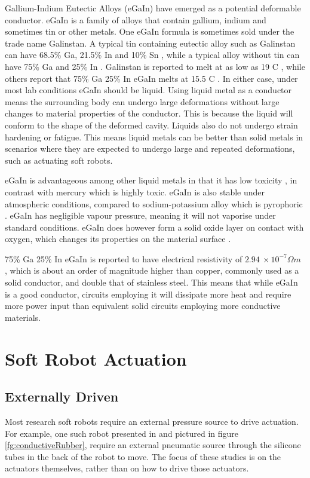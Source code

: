 \documentclass[a4paper,12pt]{article}
\begin{document}
Gallium-Indium Eutectic Alloys (eGaIn) have emerged as a potential deformable conductor. eGaIn is a family of alloys that contain gallium, indium and sometimes tin or other metals. One eGaIn formula is sometimes sold under the trade name Galinstan. A typical tin containing eutectic alloy such as Galinstan can have 68.5\% Ga, 21.5\% In and 10\% Sn \cite{liuCharacterizationNontoxicLiquidMetal2012}, while a typical alloy without tin can have 75\% Ga and 25\% In \cite{dickeyEutecticGalliumIndiumEGaIn2008}. Galinstan is reported to melt at as low as 19 \degree C \cite{surmannVoltammetricAnalysisUsing2005}, while others report that 75\% Ga 25\% In eGaIn melts at 15.5 \degree C \cite{dickeyEutecticGalliumIndiumEGaIn2008}. In either case, under most lab conditions eGaIn should be liquid.
Using liquid metal as a conductor means the surrounding body can undergo large deformations without large changes to material properties of the conductor. This is because the liquid will conform to the shape of the deformed cavity. Liquids also do not undergo strain hardening or fatigue. This means liquid metals can be better than solid metals in scenarios where they are expected to undergo large and repeated deformations, such as actuating soft robots.

eGaIn is advantageous among other liquid metals in that it has low toxicity \cite{dickeyEutecticGalliumIndiumEGaIn2008}, in contrast with mercury which is highly toxic. eGaIn is also stable under atmospheric conditions, compared to sodium-potassium alloy which is pyrophoric \cite{houghtonHazards2007}. eGaIn has negligible vapour pressure, meaning it will not vaporise under standard conditions. eGaIn does however form a solid oxide layer on contact with oxygen, which changes its properties on the material surface \cite{liuCharacterizationNontoxicLiquidMetal2012}.

75\% Ga 25\% In eGaIn  is reported to have electrical resistivity of $2.94\ \times10^{-7} \Omega m$ \cite{zrnicResistivitySurfaceTension1969}, which is about an order of magnitude higher than copper, commonly used as a solid conductor, and double that of stainless steel. This means that while eGaIn is a good conductor, circuits employing it will dissipate more heat and require more power input than equivalent solid circuits employing more conductive materials.

\section{Soft Robot Actuation}
\subsection{Externally Driven}
Most research soft robots require an external pressure source to drive actuation. For example, one such robot presented in \cite{morinCamouflageDisplaySoft2012} and pictured in figure \ref{fg:conductiveRubber}, require an external pneumatic source through the silicone tubes in the back of the robot to move. The focus of these studies is on the actuators themselves, rather than on how to drive those actuators.
\end{document}
